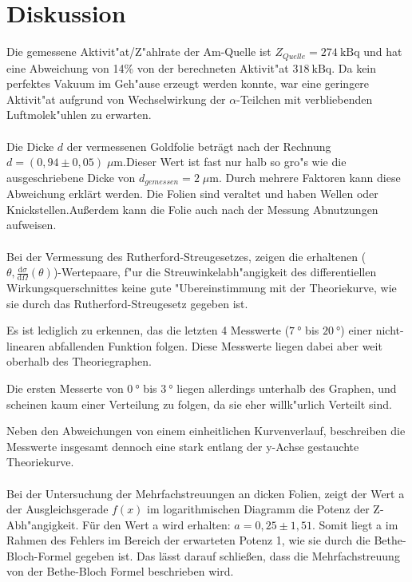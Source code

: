 \section{Diskussion}
\label{sec:Diskussion}
  Die gemessene Aktivit"at/Z"ahlrate der Am-Quelle ist $Z_{Quelle}=\SI{274}{\kilo \becquerel}$ und hat eine Abweichung von 14\% von der berechneten Aktivit"at $\SI{318}{\kilo \becquerel}$.
  Da kein perfektes Vakuum im Geh"ause erzeugt werden konnte, war eine geringere Aktivit"at aufgrund von Wechselwirkung der $\alpha$-Teilchen mit verbliebenden Luftmolek"uhlen zu erwarten.\\
  \\Die Dicke $d$ der vermessenen Goldfolie beträgt nach der Rechnung $d=(0,94 \pm 0,05)\; \mu \text{m}$.Dieser Wert ist fast nur halb so gro"s wie die ausgeschriebene Dicke von $d_{gemessen}=2\; \mu \text{m}$. Durch mehrere Faktoren kann diese Abweichung erklärt werden. Die Folien sind veraltet und haben Wellen oder Knickstellen.Außerdem kann die Folie auch nach der Messung Abnutzungen aufweisen. \\
  \\Bei der Vermessung des Rutherford-Streugesetzes, zeigen die erhaltenen ($\theta,\frac{\text{d}\sigma}{\text{d}\Omega}(\theta)$)-Wertepaare, f"ur die Streuwinkelabh"angigkeit des differentiellen Wirkungsquerschnittes keine gute "Ubereinstimmung mit der Theoriekurve, wie sie durch das Rutherford-Streugesetz gegeben ist.

  Es ist lediglich zu erkennen, das die letzten 4 Messwerte ($\SI{7}{\degree}$ bis $\SI{20}{\degree}$) einer nicht-linearen abfallenden Funktion folgen.
  Diese Messwerte liegen dabei aber weit oberhalb des Theoriegraphen.

  Die ersten Messerte von $\SI{0}{\degree}$ bis $\SI{3}{\degree}$ liegen allerdings unterhalb des Graphen, und scheinen kaum einer Verteilung zu folgen, da sie eher willk"urlich Verteilt sind.

  Neben den Abweichungen von einem einheitlichen Kurvenverlauf, beschreiben die Messwerte insgesamt dennoch eine stark entlang der y-Achse gestauchte Theoriekurve.\\
 \\Bei der Untersuchung der Mehrfachstreuungen an dicken Folien, zeigt der Wert a der Ausgleichsgerade $f(x)$ im logarithmischen Diagramm die Potenz der Z-Abh"angigkeit. Für den Wert a wird erhalten: $a=0,25 \pm 1,51$. Somit liegt a im Rahmen des Fehlers im Bereich der erwarteten Potenz 1, wie sie durch die Bethe-Bloch-Formel gegeben ist. Das lässt darauf schließen, dass die Mehrfachstreuung von der Bethe-Bloch Formel beschrieben wird.
